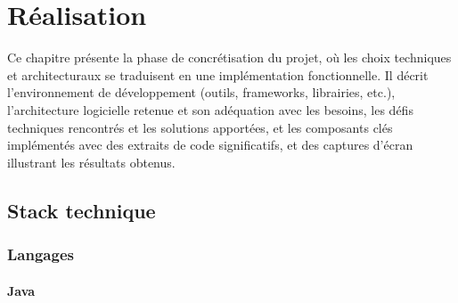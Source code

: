 \documentclass[12pt,a4paper]{report}
\begin{document}
	\chapter{Réalisation}
	
	Ce chapitre présente la phase de concrétisation du projet, où les choix techniques et architecturaux se traduisent en une implémentation fonctionnelle. Il décrit l'environnement de développement (outils, frameworks, librairies, etc.), l'architecture logicielle retenue et son adéquation avec les besoins, les défis techniques rencontrés et les solutions apportées, et les composants clés implémentés avec des extraits de code significatifs, et des captures d'écran illustrant les résultats obtenus.
	
	\section{Stack technique}
	
	\subsection{Langages}
	
	\subsubsection{Java}
	
\end{document}
